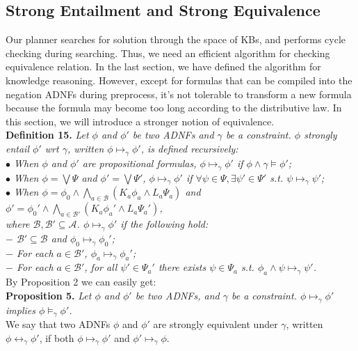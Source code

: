\documentclass{llncs}
\begin{document}
\subsection{Strong Entailment and Strong Equivalence}
Our planner searches for solution through the space of KBs, and performs cycle checking during searching. Thus, we need an efficient algorithm for checking equivalence relation. In the last section, we have defined the algorithm for knowledge reasoning. However, except for formulas that can be compiled into the negation ADNFs during preprocess, it's not tolerable to transform a new formula because the formula may become too long according to the distributive law. In this section, we will introduce a stronger notion of equivalence.\vspace{0.05in}\\
\textbf{Definition 15.} \textit{Let $\phi$ and $\phi'$ be two ADNFs and $\gamma$ be a constraint. $\phi$ strongly entail $\phi'$ wrt $\gamma$, written $\phi\mapsto_\gamma\phi'$, is defined recursively:\\
\hspace*{0.1in}$\bullet$ When $\phi$ and $\phi'$ are propositional formulas, $\phi\mapsto_\gamma\phi'$ if $\phi\land\gamma\models\phi'$;\\
\hspace*{0.1in}$\bullet$ When $\phi=\bigvee\Psi$ and $\phi'=\bigvee\Psi'$, $\phi\mapsto_\gamma\phi'$ if $\forall\psi\in\Psi,\exists\psi'\in\Psi'$ s.t. $\psi\mapsto_\gamma\psi'$;\\
\hspace*{0.1in}$\bullet$ When $\phi=\phi_0\land\bigwedge_{a\in\mathcal{B}}(K_a\phi_a\land L_a\Psi_a)$ and $\phi'=\phi_0'\land\bigwedge_{a\in\mathcal{B}'}(K_a\phi_a'\land L_a\Psi_a')$, \\
\hspace*{0.1in}\hspace{0.1in} where $\mathcal{B},\mathcal{B}'\subseteq\mathcal{A}$. $\phi\mapsto_\gamma\phi'$ if the following hold:\\
\hspace*{0.1in}\quad $-$ $\mathcal{B}'\subseteq\mathcal{B}$ and $\phi_0\mapsto_\gamma\phi_0'$;\\
\hspace*{0.1in}\quad $-$ For each $a\in\mathcal{B}'$, $\phi_a\mapsto_\gamma\phi_a'$;\\
\hspace*{0.1in}\quad $-$ For each $a\in\mathcal{B}'$, for all $\psi'\in\Psi_a'$ there exists $\psi\in\Psi_a$ s.t. $\phi_a\land\psi\mapsto_\gamma\psi'$.}\vspace{0.05in}\\
By Proposition 2 we can easily get:\vspace{0.05in}\\
\textbf{Proposition 5.} \textit{Let $\phi$ and $\phi'$ be two ADNFs, and $\gamma$ be a constraint. $\phi\mapsto_\gamma\phi'$ implies $\phi\models_\gamma\phi'$.}\vspace{0.05in}\\
We say that two ADNFs $\phi$ and $\phi'$ are strongly equivalent under $\gamma$, written $\phi\leftrightarrow_\gamma\phi'$, if both $\phi\mapsto_\gamma\phi'$ and $\phi'\mapsto_\gamma\phi$.
\end{document}
